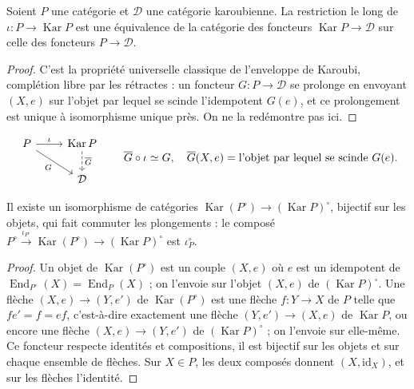 \begin{lemme}\label{lem:113-univ}
Soient $P$ une catégorie et $\mathcal D$ une catégorie karoubienne. La restriction le long de $\iota : P \to \operatorname{Kar} P$ est une équivalence de la catégorie des foncteurs $\operatorname{Kar} P \to \mathcal D$ sur celle des foncteurs $P \to \mathcal D$.
\end{lemme}

\begin{proof}
C'est la propriété universelle classique de l'enveloppe de Karoubi, complétion libre par les rétractes : un foncteur $G : P \to \mathcal D$ se prolonge en envoyant $(X, e)$ sur l'objet par lequel se scinde l'idempotent $G(e)$, et ce prolongement est unique à isomorphisme unique près. On ne la redémontre pas ici.
\end{proof}

\[
\begin{tikzcd}
P \arrow[r, "\iota"] \arrow[rd, "G"'] & \operatorname{Kar} P \arrow[d, dashed, "\overline G"] \\
& \mathcal D
\end{tikzcd}
\qquad \overline G \circ \iota \simeq G,\quad \overline G(X, e) = \text{l'objet par lequel se scinde } G(e).
\]

\begin{lemme}\label{lem:113-op}
Il existe un isomorphisme de catégories $\operatorname{Kar}(P^\circ) \to (\operatorname{Kar} P)^\circ$, bijectif sur les objets, qui fait commuter les plongements : le composé $P^\circ \xrightarrow{\iota_{P^\circ}} \operatorname{Kar}(P^\circ) \to (\operatorname{Kar} P)^\circ$ est $\iota_P^\circ$.
\end{lemme}

\begin{proof}
Un objet de $\operatorname{Kar}(P^\circ)$ est un couple $(X, e)$ où $e$ est un idempotent de $\operatorname{End}_{P^\circ}(X) = \operatorname{End}_P(X)$ ; on l'envoie sur l'objet $(X, e)$ de $(\operatorname{Kar} P)^\circ$. Une flèche $(X, e) \to (Y, e')$ de $\operatorname{Kar}(P^\circ)$ est une flèche $f : Y \to X$ de $P$ telle que $f e' = f = e f$, c'est-à-dire exactement une flèche $(Y, e') \to (X, e)$ de $\operatorname{Kar} P$, ou encore une flèche $(X, e) \to (Y, e')$ de $(\operatorname{Kar} P)^\circ$ ; on l'envoie sur elle-même. Ce foncteur respecte identités et compositions, il est bijectif sur les objets et sur chaque ensemble de flèches. Sur $X \in P$, les deux composés donnent $(X, \mathrm{id}_X)$, et sur les flèches l'identité.
\end{proof}

